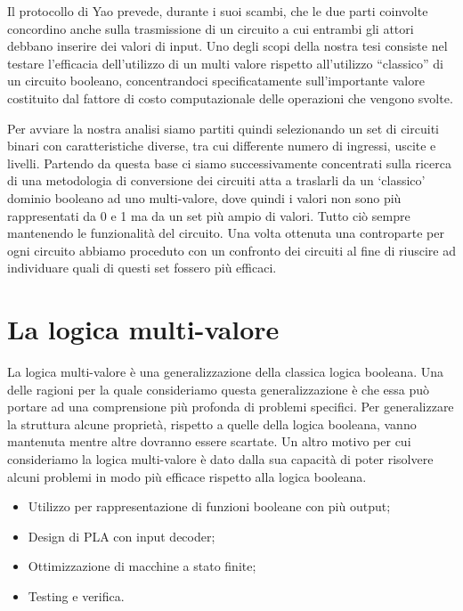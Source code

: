 \documentclass[
]{book}
\providecommand{\tightlist}{%
  \setlength{\itemsep}{0pt}\setlength{\parskip}{0pt}}
\begin{document}
Il protocollo di Yao prevede, durante i suoi scambi, che le due parti coinvolte concordino anche sulla trasmissione di un circuito a cui entrambi gli attori debbano inserire dei valori di input. Uno degli scopi della nostra tesi consiste nel testare l'efficacia dell'utilizzo di un multi valore rispetto all'utilizzo ``classico'' di un circuito booleano, concentrandoci specificatamente sull'importante valore costituito dal fattore di costo computazionale delle operazioni che vengono svolte.

Per avviare la nostra analisi siamo partiti quindi selezionando un set di circuiti binari con caratteristiche diverse, tra cui differente numero di ingressi, uscite e livelli. Partendo da questa base ci siamo successivamente concentrati sulla ricerca di una metodologia di conversione dei circuiti atta a traslarli da un `classico' dominio booleano ad uno multi-valore, dove quindi i valori non sono più rappresentati da 0 e 1 ma da un set più ampio di valori. Tutto ciò sempre mantenendo le funzionalità del circuito. Una volta ottenuta una controparte per ogni circuito abbiamo proceduto con un confronto dei circuiti al fine di riuscire ad individuare quali di questi set fossero più efficaci.

\newpage

\hypertarget{la-logica-multi-valore}{%
\section{La logica multi-valore}\label{la-logica-multi-valore}}

La logica multi-valore è una generalizzazione della classica logica booleana. Una delle ragioni per la quale consideriamo questa generalizzazione è che essa può portare ad una comprensione più profonda di problemi specifici. Per generalizzare la struttura alcune proprietà, rispetto a quelle della logica booleana, vanno mantenuta mentre altre dovranno essere scartate. Un altro motivo per cui consideriamo la logica multi-valore è dato dalla sua capacità di poter risolvere alcuni problemi in modo più efficace rispetto alla logica booleana.

\begin{itemize}
\tightlist
\item
  Utilizzo per rappresentazione di funzioni booleane con più output;
\item
  Design di PLA con input decoder;
\item
  Ottimizzazione di macchine a stato finite;
\item
  Testing e verifica.
\end{itemize}
\end{document}

